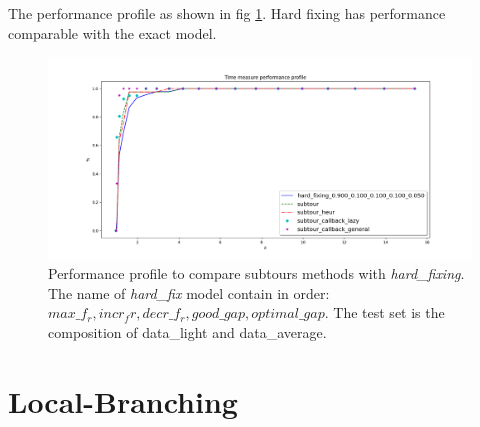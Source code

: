 The performance profile as shown in fig \ref{fig:Lsubtours_hardfixing_lightaverage_time}. Hard fixing has performance comparable with the exact model.

\begin{figure}[h]
	\centering
	\includegraphics[width=\columnwidth]{../res/Lsubtours_hardfixing_lightaverage_time.png}
	\caption{Performance profile to compare subtours methods with \textit{hard\_fixing}. The name of \textit{hard\_fix} model contain in order: $ max\_f_r, incr_fr, decr\_f_r, good\_gap, optimal\_gap $. The test set is the composition of data\_light and data\_average.}
	\label{fig:Lsubtours_hardfixing_lightaverage_time}
\end{figure}


\section{Local-Branching}

